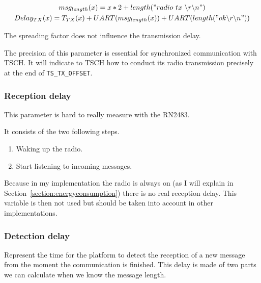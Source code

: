 \begin{gather}
  \label{eq:transmissiondelay}
  msg_{length}(x) = x * 2 + length("radio~tx~\backslash r \backslash n") \\
  Delay_{TX}(x) = T_{TX}(x) + UART(msg_{length}(x)) + UART(length("ok \backslash r\backslash n"))
\end{gather}

The spreading factor does not influence the transmission delay.

The precision of this parameter is essential for synchronized communication
with TSCH. It will indicate to TSCH how to conduct its radio transmission
precisely at the end of \lstinline{TS_TX_OFFSET}.

\subsubsection{Reception delay}

This parameter is hard to really measure with the RN2483.

It consists of the two following steps.

\begin{enumerate}
  \item Waking up the radio.
  \item Start listening to incoming messages.
\end{enumerate}

Because in my implementation the radio is always on (as I will explain in
Section~\ref{section:energyconsumption}) there is no real reception
delay.
This variable is then not used but should be taken into account in other
implementations.

\subsubsection{Detection delay\label{section:detectiondelay}}


Represent the time for the platform to detect the reception of a new message
from the moment the communication is finished.
This delay is made of two parts we can calculate when we know the message
length.

